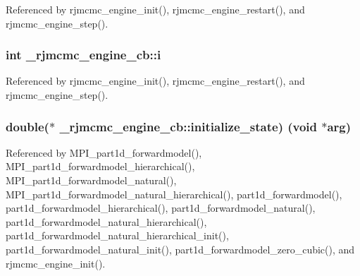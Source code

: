 Referenced by rjmcmc\+\_\+engine\+\_\+init(), rjmcmc\+\_\+engine\+\_\+restart(), and rjmcmc\+\_\+engine\+\_\+step().

\subsubsection[{\texorpdfstring{i}{i}}]{\setlength{\rightskip}{0pt plus 5cm}int \+\_\+rjmcmc\+\_\+engine\+\_\+cb\+::i}\hypertarget{struct__rjmcmc__engine__cb_af0051d723354a538f33b9c245b2426c3}{}\label{struct__rjmcmc__engine__cb_af0051d723354a538f33b9c245b2426c3}


Referenced by rjmcmc\+\_\+engine\+\_\+init(), rjmcmc\+\_\+engine\+\_\+restart(), and rjmcmc\+\_\+engine\+\_\+step().

\subsubsection[{\texorpdfstring{initialize\+\_\+state}{initialize_state}}]{\setlength{\rightskip}{0pt plus 5cm}double($\ast$ \+\_\+rjmcmc\+\_\+engine\+\_\+cb\+::initialize\+\_\+state) (void $\ast${\bf arg})}\hypertarget{struct__rjmcmc__engine__cb_a57db290226797053fee2f8af0577aaa6}{}\label{struct__rjmcmc__engine__cb_a57db290226797053fee2f8af0577aaa6}


Referenced by M\+P\+I\+\_\+part1d\+\_\+forwardmodel(), M\+P\+I\+\_\+part1d\+\_\+forwardmodel\+\_\+hierarchical(), M\+P\+I\+\_\+part1d\+\_\+forwardmodel\+\_\+natural(), M\+P\+I\+\_\+part1d\+\_\+forwardmodel\+\_\+natural\+\_\+hierarchical(), part1d\+\_\+forwardmodel(), part1d\+\_\+forwardmodel\+\_\+hierarchical(), part1d\+\_\+forwardmodel\+\_\+natural(), part1d\+\_\+forwardmodel\+\_\+natural\+\_\+hierarchical(), part1d\+\_\+forwardmodel\+\_\+natural\+\_\+hierarchical\+\_\+init(), part1d\+\_\+forwardmodel\+\_\+natural\+\_\+init(), part1d\+\_\+forwardmodel\+\_\+zero\+\_\+cubic(), and rjmcmc\+\_\+engine\+\_\+init().

